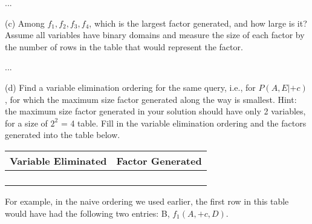 \documentclass[11pt, answers]{exam}
\begin{document}
\begin{questions}
	\begin{solution}
	...
	\end{solution}
	
(c) Among $f_1,f_2,f_3,f_4$, which is the largest factor generated, and how large is it? Assume all variables have binary domains and measure the size of each factor by the number of rows in the table that would represent the factor.

	\begin{solution}
	...
	\end{solution}
\newpage
(d) Find a variable elimination ordering for the same query, i.e., for $P(A,E|+c)$, for which the maximum size factor generated along the way is smallest. Hint: the maximum size factor generated in your solution should have only 2 variables, for a size of $2^2$ = 4 table. Fill in the variable elimination ordering and the factors generated into the table below.

\begin{table}[h!]
\centering
\begin{tabular}{|l|l|}
\hline
Variable Eliminated & Factor Generated \\ \hline
                    &                  \\ \hline
                    &                  \\ \hline
                    &                  \\ \hline
                    &                  \\ \hline
\end{tabular}
\end{table}

For example, in the naive ordering we used earlier, the first row in this table would have had the following two entries: B, $f_1(A,+c,D)$.
\end{questions}
\end{document}
